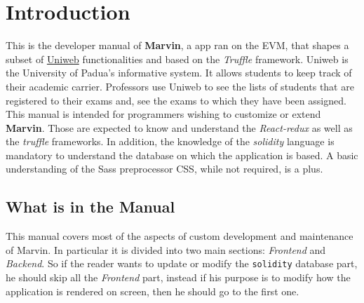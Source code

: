 \section{Introduction}
This is the developer manual of \textbf{Marvin}, a \DH app ran on the EVM, that shapes a subset of \href{www.uniweb.unipd.it}{Uniweb} functionalities and based on the \emph{Truffle} framework. Uniweb is the University of Padua's informative system.
It allows students to keep track of their academic carrier. Professors use Uniweb to see the lists of students that are registered to their exams and, see the exams to which they have been assigned.
\\This manual is intended for programmers wishing to customize or extend \textbf{Marvin}. Those are expected to know and understand the \emph{React-redux} as well as the \emph{truffle} frameworks. In addition, the knowledge of the \emph{solidity} language is mandatory to understand the database on which the application is based. A basic understanding of the Sass preprocessor CSS, while not required, is a plus.

\subsection{What is in the Manual}
This manual covers  most of the aspects of custom development and maintenance of Marvin.
In particular it is divided into two main sections: \emph{Frontend}  and \emph{Backend}. So if the reader wants to update or modify the \verb|solidity| database part, he should skip all the \emph{Frontend} part, instead if his purpose is to modify how the application is rendered on screen, then he should go to the first one.

